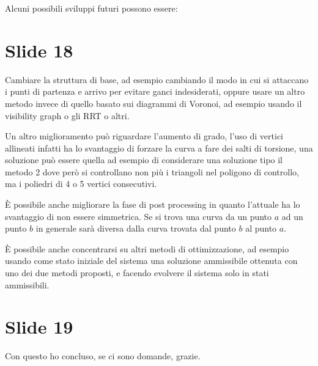 \documentclass{article}
\begin{document}
Alcuni possibili sviluppi futuri possono essere:

\section*{Slide 18}
Cambiare la struttura di base, ad esempio cambiando il modo in cui si
attaccano i punti di partenza e arrivo per evitare ganci indesiderati,
oppure usare un altro metodo invece di quello basato sui diagrammi di
Voronoi, ad esempio usando il visibility graph o gli RRT o altri.

Un altro miglioramento può riguardare l'aumento di grado, l'uso di
vertici allineati infatti ha lo svantaggio di forzare la curva a fare
dei salti di torsione, una soluzione può essere quella ad esempio di
considerare una soluzione tipo il metodo 2 dove però si controllano
non più i triangoli nel poligono di controllo, ma i poliedri di 4 o 5
vertici consecutivi.

È possibile anche migliorare la fase di post processing in quanto
l'attuale ha lo svantaggio di non essere simmetrica. Se si trova una
curva da un punto $a$ ad un punto $b$ in generale sarà diversa dalla
curva trovata dal punto $b$ al punto $a$.

È possibile anche concentrarsi su altri metodi di ottimizzazione, ad
esempio usando come stato iniziale del sistema una soluzione
ammissibile ottenuta con uno dei due 
metodi proposti, e facendo evolvere il sistema solo in stati
ammissibili.

\section*{Slide 19}
Con questo ho concluso, se ci sono domande, grazie.
\end{document}
